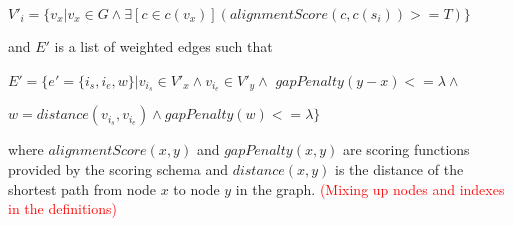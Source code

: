 \documentclass[thesis.tex]{subfiles}
\begin{document}
\par
$V'_i=\{v_x|v_x \in G \land \exists [c \in c(v_x)](alignmentScore(c, c(s_i)) >= T)\}$\\
\par\noindent
and $E'$ is a list of weighted edges such that\\
\par
$E'=\{e'=\{i_s, i_e, w\}|v_{i_s} \in V'_x \wedge v_{i_e} \in V'_y \wedge$ $gapPenalty(y - x) <= \lambda \wedge $\par$w=distance(v_{i_s}, v_{i_e}) \wedge gapPenalty(w) <= \lambda\}$\\
\par\noindent
where $alignmentScore(x, y)$ and $gapPenalty(x, y)$ are scoring functions provided by the scoring schema and $distance(x, y)$ is the distance of the shortest path from node $x$ to node $y$ in the graph. \textcolor{red}{(Mixing up nodes and indexes in the definitions)}\\
\par\noindent
\end{document}
